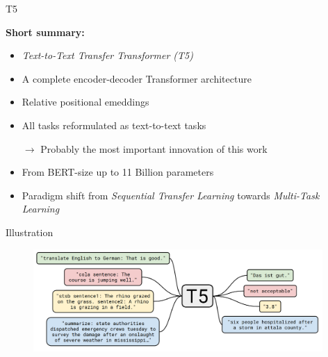 \begin{frame}{T5}

\vfill

	\textbf{Short summary:}

	\begin{itemize}
		\item \textit{Text-to-Text Transfer Transformer (T5)}
		\item A complete encoder-decoder Transformer architecture
		\item Relative positional emeddings
		\item All tasks reformulated as text-to-text tasks
		\item[$\to$] Probably the most important innovation of this work
		\item From BERT-size up to 11 Billion parameters
		\item Paradigm shift from \textit{Sequential Transfer Learning} towards \textit{Multi-Task Learning}
	\end{itemize}
	
	\vspace{.5cm}

	\begin{center}
		\href{https://1.bp.blogspot.com/-o4oiOExxq1s/Xk26XPC3haI/AAAAAAAAFU8/NBlvOWB84L0PTYy9TzZBaLf6fwPGJTR0QCLcBGAsYHQ/s1600/image3.gif}{\textbf{}}
	\end{center}
	
\vfill

\end{frame}


\begin{frame}{Illustration}

\vfill
	
	\begin{figure}
		\centering
		\includegraphics[width = 11cm]{figure/t5.png}\\ 
	\end{figure}
	
\vfill

\end{frame}

